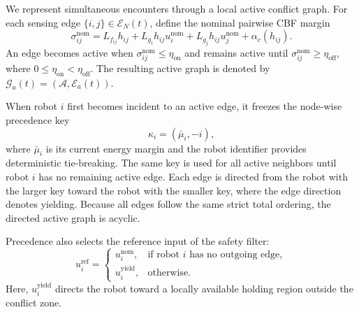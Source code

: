 We represent simultaneous encounters through a local active conflict graph. 
For each sensing edge $\{i,j\}\in\mathcal E_N(t)$, define the nominal pairwise CBF margin
\begin{equation}
    \sigma_{ij}^{\mathrm{nom}}=
    L_{f_{ij}}h_{ij}+
    L_{g_i}h_{ij}u_i^{\mathrm{nom}}+
    L_{g_j}h_{ij}u_j^{\mathrm{nom}}+
    \alpha_c(h_{ij}).
    \label{eq:nominal_pairwise_margin}
\end{equation}
An edge becomes active when $\sigma_{ij}^{\mathrm{nom}}\leq\eta_{\mathrm{on}}$ and remains active until $\sigma_{ij}^{\mathrm{nom}}\geq\eta_{\mathrm{off}}$, where $0\leq\eta_{\mathrm{on}}<\eta_{\mathrm{off}}$.
The resulting active graph is denoted by $\mathcal G_a(t)=(\mathcal A,\mathcal E_a(t))$.

When robot $i$ first becomes incident to an active edge, it freezes the node-wise precedence key
\begin{equation}
    \kappa_i=(\bar\mu_i,-i),
    \label{eq:precedence_key}
\end{equation}
where $\bar\mu_i$ is its current energy margin and the robot identifier provides deterministic tie-breaking.
The same key is used for all active neighbors until robot $i$ has no remaining active edge.
Each edge is directed from the robot with the larger key toward the robot with the smaller key, where the edge direction denotes yielding.
Because all edges follow the same strict total ordering, the directed active graph is acyclic.

Precedence also selects the reference input of the safety filter:
\begin{equation}
    u_i^{\mathrm{ref}}
    =
    \begin{cases}
        u_i^{\mathrm{nom}},
        & \text{if robot $i$ has no outgoing edge},\\
        u_i^{\mathrm{yield}},
        & \text{otherwise}.
    \end{cases}
    \label{eq:precedence_reference}
\end{equation}
Here, $u_i^{\mathrm{yield}}$ directs the robot toward a locally available holding region outside the conflict zone.

